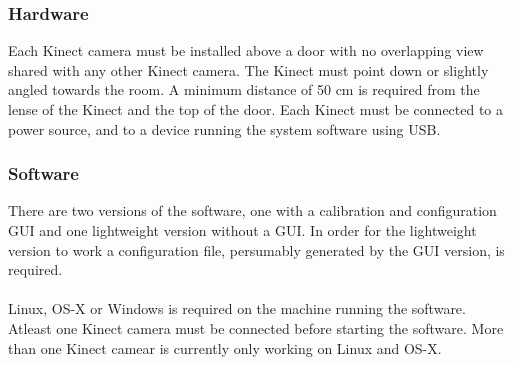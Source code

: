 \subsubsection{Hardware}
Each Kinect camera must be installed above a door with no overlapping view shared with any other Kinect camera. The Kinect must point down or slightly angled towards the room. A minimum distance of 50 cm is required from the lense of the Kinect and the top of the door. Each Kinect must be connected to a power source, and to a device running the system software using USB.
\subsubsection{Software}
There are two versions of the software, one with a calibration and configuration GUI and one lightweight version without a GUI. In order for the lightweight version to work a configuration file, persumably generated by the GUI version, is required.\\
\\
Linux, OS-X or Windows is required on the machine running the software. Atleast one Kinect camera must be connected before starting the software. More than one Kinect camear is currently only working on Linux and OS-X. 
